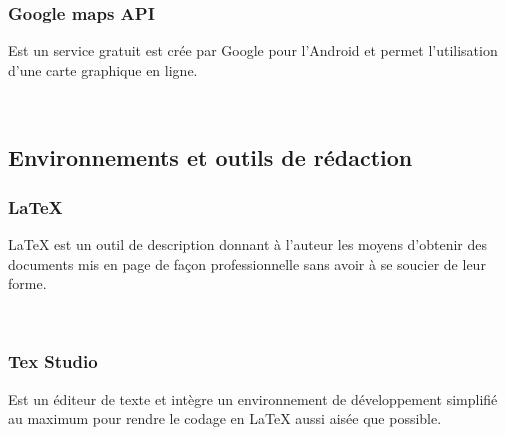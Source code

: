 \documentclass[french,a4,12pt]{report}
\begin{document}
	\subsubsection*{Google maps API}
\begin{minipage}{0.5\textwidth}
Est un service gratuit est crée par Google pour l'Android et permet l'utilisation d'une carte graphique en ligne. 
\end{minipage}
~
\newpage
\begin{tcolorbox}[leftrule=3mm]
	\section{Environnements et outils de rédaction} 
\end{tcolorbox}

\begin{minipage}{0.5\textwidth}
\subsubsection*{\LaTeX}
\textsf{LaTeX est un outil de description donnant à l'auteur les moyens d'obtenir des documents mis en page de façon professionnelle sans avoir à se soucier de leur forme.} 
\end{minipage}
~
%
\subsubsection*{Tex Studio}
\begin{minipage}{0.5\textwidth}
Est un éditeur de texte et intègre un environnement de développement simplifié au maximum pour rendre le codage en LaTeX aussi aisée que possible. 
\end{minipage}
~
%
\end{document}

